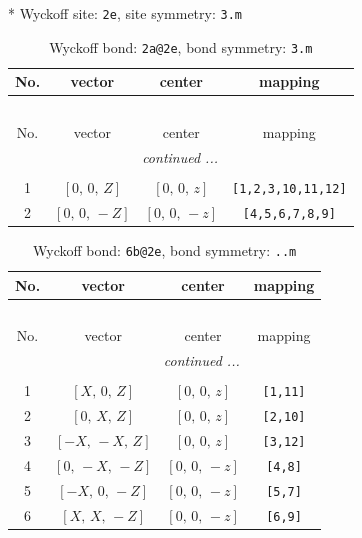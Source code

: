 \documentclass[fleqn,8pt]{jsarticle}
\begin{document}
* Wyckoff site: {\tt 2e}, site symmetry: {\tt 3.m}
\renewcommand{\arraystretch}{1.2}
\begin{longtable}{cccc}
\caption{Wyckoff bond: {\tt 2a@2e}, bond symmetry: {\tt 3.m}}
 \\
 \hline \hline
No. & vector & center & mapping \\ \hline \endfirsthead

\multicolumn{3}{l}{\tablename\ \thetable{}} \\
 \hline \hline
No. & vector & center & mapping \\ \hline \endhead

 \hline \hline
\multicolumn{3}{r}{\footnotesize\it continued ...} \\ \endfoot

 \hline \hline
\multicolumn{3}{r}{} \\ \endlastfoot

1 & $\left[ 0,\, 0,\, Z \right]$ & $\left[ 0,\, 0,\, z \right]$ & {\tt [1,2,3,10,11,12]} \\ \hline
2 & $\left[ 0,\, 0,\, - Z \right]$ & $\left[ 0,\, 0,\, - z \right]$ & {\tt [4,5,6,7,8,9]} \\
\end{longtable}
\renewcommand{\arraystretch}{1.2}
\begin{longtable}{cccc}
\caption{Wyckoff bond: {\tt 6b@2e}, bond symmetry: {\tt ..m}}
 \\
 \hline \hline
No. & vector & center & mapping \\ \hline \endfirsthead

\multicolumn{3}{l}{\tablename\ \thetable{}} \\
 \hline \hline
No. & vector & center & mapping \\ \hline \endhead

 \hline \hline
\multicolumn{3}{r}{\footnotesize\it continued ...} \\ \endfoot

 \hline \hline
\multicolumn{3}{r}{} \\ \endlastfoot

1 & $\left[ X,\, 0,\, Z \right]$ & $\left[ 0,\, 0,\, z \right]$ & {\tt [1,11]} \\ \hline
2 & $\left[ 0,\, X,\, Z \right]$ & $\left[ 0,\, 0,\, z \right]$ & {\tt [2,10]} \\ \hline
3 & $\left[ - X,\, - X,\, Z \right]$ & $\left[ 0,\, 0,\, z \right]$ & {\tt [3,12]} \\ \hline
4 & $\left[ 0,\, - X,\, - Z \right]$ & $\left[ 0,\, 0,\, - z \right]$ & {\tt [4,8]} \\ \hline
5 & $\left[ - X,\, 0,\, - Z \right]$ & $\left[ 0,\, 0,\, - z \right]$ & {\tt [5,7]} \\ \hline
6 & $\left[ X,\, X,\, - Z \right]$ & $\left[ 0,\, 0,\, - z \right]$ & {\tt [6,9]} \\
\end{longtable}
\end{document}
